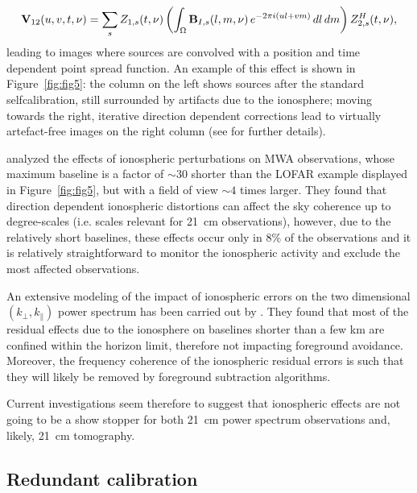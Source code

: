 \begin{itemize}
\begin{equation}
{\bf V}_{12} (u,v,t,\nu) = \sum_s Z_{1,s} (t, \nu) \left ( \int_\Omega {\bf B}_{I,s} (l, m, \nu) \, e^{-2 \pi i (ul + vm)} \,  dl \, dm \right ) Z_{2,s}^H (t, \nu),
\label{eq:sec:12}
\end{equation}
leading to images where sources are convolved with a position and time dependent point spread function. An example of this effect is shown in Figure~\ref{fig:fig5}: the column on the left shows sources after the standard selfcalibration, still surrounded by artifacts due to the ionosphere; moving towards the right,  iterative direction dependent corrections lead to virtually artefact-free images on the right column (see \cite{vanweeren16} for further details). 

\cite{trott17b} analyzed the effects of ionospheric perturbations on MWA observations, whose maximum baseline is a factor of $\sim 30$ shorter than the LOFAR example displayed in Figure~\ref{fig:fig5}, but with a field of view $\sim 4$ times larger. They found that direction dependent ionospheric distortions can affect the sky coherence up to degree-scales (i.e. scales relevant for 21~cm observations), however, due to the relatively short baselines, these effects occur only in 8\% of the observations and it is relatively straightforward to monitor the ionospheric activity and exclude the most affected observations.

An extensive modeling of the impact of ionospheric errors on the two dimensional $(k_\perp,k_\parallel)$ power spectrum has been carried out by \cite{vedantham16}. They found that most of the residual effects due to the ionosphere on baselines shorter than a few km are confined within the horizon limit, therefore not impacting foreground avoidance. Moreover, the frequency coherence of the ionospheric residual errors is such that they will likely be removed by foreground subtraction algorithms.

Current investigations seem therefore to suggest that ionospheric effects are not going to be a show stopper for both 21~cm power spectrum observations and, likely, 21~cm tomography. 
\end{itemize}





\subsection{Redundant calibration}

